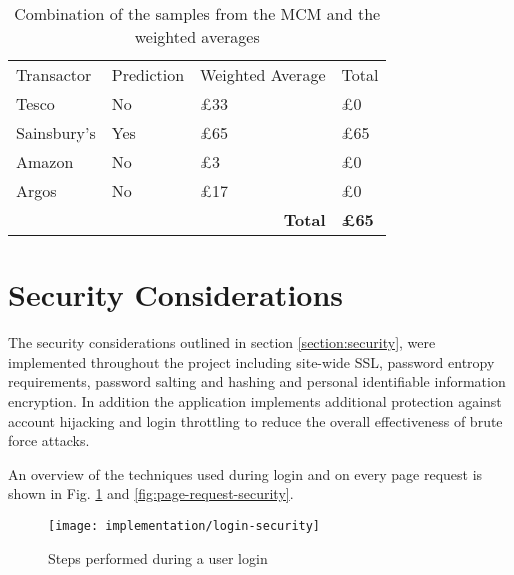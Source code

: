 \begin{table}[h]
\centering
\begin{tabular}{llll}
Transactor  & Prediction & Weighted Average                   & Total        \\
Tesco       & No         & £33                                & £0           \\
Sainsbury's & Yes        & £65                                & £65          \\
Amazon      & No         & £3                                 & £0           \\
Argos       & No         & £17                                & £0           \\
            &            & \multicolumn{1}{r}{\textbf{Total}} & \textbf{£65}
\end{tabular}

\caption{Combination of the samples from the MCM and the weighted averages}
\label{table:predictions-combined}
\end{table}

\section[Security]{Security Considerations}
The security considerations outlined in section \ref{section:security}, were implemented throughout the project including site-wide SSL, password entropy requirements, password salting and hashing and personal identifiable information encryption. In addition the application implements additional protection against account hijacking and login throttling to reduce the overall effectiveness of brute force attacks. 

An overview of the techniques used during login and on every page request is shown in Fig. \ref{fig:login-security} and \ref{fig:page-request-security}.

\begin{figure}[h]
    \centering
    \texttt{[image: implementation/login-security]}
    \caption{Steps performed during a user login}
    \label{fig:login-security}
    
    \begin{comment}
(start)->[Login Page]->(User Login)-><a>
<a>->|b|
<a>->(Count Recent Failed Logins)-><d>
<d>->(Prevent Login for Threshold Time)->[Login Page]
<d>->[Login Page]
|b|->(Create Login Session)->(end)
|b|->(Record FingerPrint)->(Record Session ID)->(end)
    \end{comment}
\end{figure}


